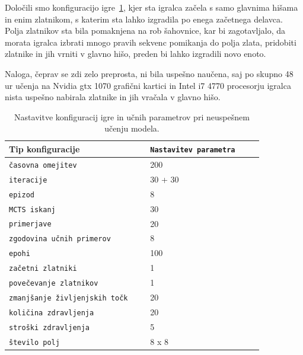 \documentclass[a4paper, 12pt]{book}
\begin{document}
Določili smo konfiguracijo igre~\ref{tabelLearnConfig}, kjer sta igralca začela s samo glavnima hišama in enim zlatnikom, s katerim sta lahko izgradila po enega začetnega delavca.
Polja zlatnikov sta bila pomaknjena na rob šahovnice, kar bi zagotavljalo, da morata igralca izbrati mnogo pravih sekvenc pomikanja do polja zlata, pridobiti zlatnike in jih vrniti v glavno hišo, preden bi lahko izgradili novo enoto.

Naloga, čeprav se zdi zelo preprosta, ni bila uspešno naučena, saj po skupno 48 ur učenja na Nvidia gtx 1070 grafični kartici in Intel i7 4770 procesorju igralca nista uspešno nabirala zlatnike in jih vračala v glavno hišo.

\begin{table}
	\begin{center}
		\begin{tabular}{p{0.5\linewidth}|p{0.4\linewidth}}
			Tip konfiguracije                          & {\tt Nastavitev parametra} \\ \hline
			{\tt časovna omejitev}                     & 200                     \\
			{\tt iteracije}                            & 30 + 30                 \\
			{\tt epizod}                               & 8                       \\
			{\tt MCTS iskanj}                          & 30                      \\
			{\tt primerjave}                           & 20                      \\
			{\tt zgodovina učnih primerov}             & 8                       \\
			{\tt epohi}                                & 100                     \\
			{\tt začetni zlatniki}                     & 1                       \\
			{\tt povečevanje zlatnikov}                & 1                       \\
			{\tt zmanjšanje življenjskih točk}         & 20                      \\
			{\tt količina zdravljenja}                 & 20                      \\
			{\tt stroški zdravljenja}                  & 5                       \\
			{\tt število polj}                         & 8 x 8                   \\
			
		\end{tabular}
	\end{center}
	\caption{Nastavitve konfiguracij igre in učnih parametrov pri neuspešnem učenju modela.}
	\label{tabelLearnConfig}
\end{table}
\end{document}

